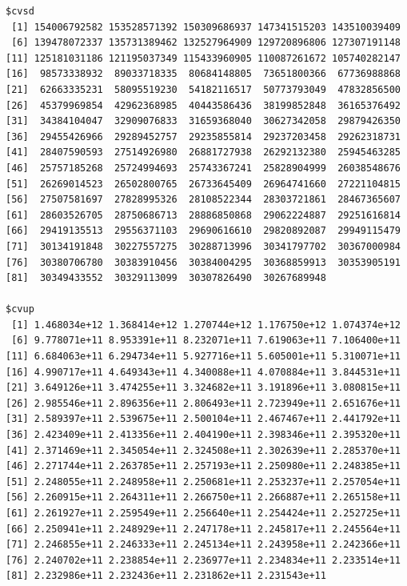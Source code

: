 \documentclass[
]{article}
\begin{document}
\begin{verbatim}
$cvsd
 [1] 154006792582 153528571392 150309686937 147341515203 143510039409
 [6] 139478072337 135731389462 132527964909 129720896806 127307191148
[11] 125181031186 121195037349 115433960905 110087261672 105740282147
[16]  98573338932  89033718335  80684148805  73651800366  67736988868
[21]  62663335231  58095519230  54182116517  50773793049  47832856500
[26]  45379969854  42962368985  40443586436  38199852848  36165376492
[31]  34384104047  32909076833  31659368040  30627342058  29879426350
[36]  29455426966  29289452757  29235855814  29237203458  29262318731
[41]  28407590593  27514926980  26881727938  26292132380  25945463285
[46]  25757185268  25724994693  25743367241  25828904999  26038548676
[51]  26269014523  26502800765  26733645409  26964741660  27221104815
[56]  27507581697  27828995326  28108522344  28303721861  28467365607
[61]  28603526705  28750686713  28886850868  29062224887  29251616814
[66]  29419135513  29556371103  29690616610  29820892087  29949115479
[71]  30134191848  30227557275  30288713996  30341797702  30367000984
[76]  30380706780  30383910456  30384004295  30368859913  30353905191
[81]  30349433552  30329113099  30307826490  30267689948

$cvup
 [1] 1.468034e+12 1.368414e+12 1.270744e+12 1.176750e+12 1.074374e+12
 [6] 9.778071e+11 8.953391e+11 8.232071e+11 7.619063e+11 7.106400e+11
[11] 6.684063e+11 6.294734e+11 5.927716e+11 5.605001e+11 5.310071e+11
[16] 4.990717e+11 4.649343e+11 4.340088e+11 4.070884e+11 3.844531e+11
[21] 3.649126e+11 3.474255e+11 3.324682e+11 3.191896e+11 3.080815e+11
[26] 2.985546e+11 2.896356e+11 2.806493e+11 2.723949e+11 2.651676e+11
[31] 2.589397e+11 2.539675e+11 2.500104e+11 2.467467e+11 2.441792e+11
[36] 2.423409e+11 2.413356e+11 2.404190e+11 2.398346e+11 2.395320e+11
[41] 2.371469e+11 2.345054e+11 2.324508e+11 2.302639e+11 2.285370e+11
[46] 2.271744e+11 2.263785e+11 2.257193e+11 2.250980e+11 2.248385e+11
[51] 2.248055e+11 2.248958e+11 2.250681e+11 2.253237e+11 2.257054e+11
[56] 2.260915e+11 2.264311e+11 2.266750e+11 2.266887e+11 2.265158e+11
[61] 2.261927e+11 2.259549e+11 2.256640e+11 2.254424e+11 2.252725e+11
[66] 2.250941e+11 2.248929e+11 2.247178e+11 2.245817e+11 2.245564e+11
[71] 2.246855e+11 2.246333e+11 2.245134e+11 2.243958e+11 2.242366e+11
[76] 2.240702e+11 2.238854e+11 2.236977e+11 2.234834e+11 2.233514e+11
[81] 2.232986e+11 2.232436e+11 2.231862e+11 2.231543e+11


\end{verbatim}
\end{document}
